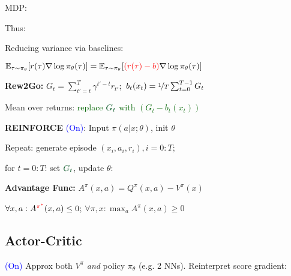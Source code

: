 
MDP: 

Thus: 

Reducing variance via baselines:

\mbox{\fontsize{9.4}{6}\selectfont $\mathbb{E}_{\tau \sim \pi_\theta} [r(\tau) \nabla \log \pi_\theta(\tau)] = \mathbb{E}_{\tau \sim \pi_\theta} [\textcolor{red}{(r(\tau) - b)} \nabla \log \pi_\theta(\tau)]$}

\textbf{Rew2Go:} \mbox{$G_t = \sum_{t' = t}^{T} \gamma^{t' - t} r_{t'}$; $b_t(x_t) = \nicefrac{1}{T} \sum_{t=0}^{T-1} G_t$}


Mean over returns: \textcolor{darkgreen}{replace $\textcolor{darkgreen}{G_t}$ with $(G_t - b_t(x_t))$}



\textbf{REINFORCE} \textcolor{blue}{(On)}: Input $\pi(a | x; \theta)$, init $\theta$

Repeat: generate episode $(x_i, a_i, r_i), i=0:T$;

for $t=0:T$: set $\textcolor{darkgreen}{G_t}$, update $\theta$:





\textbf{Advantage Func:} {\fontsize{9.8}{6}\selectfont $A^\pi(x,a) = Q^\pi(x,a) - V^\pi(x)$}

$\forall x,a: A^{\textcolor{red}{\pi^*}}(x,a) \leq 0$; $\forall \pi,x: \max_a A^\pi(x,a) \geq 0$



\subsection*{Actor-Critic} \textcolor{blue}{(On)} Approx both $V^\pi$ \textit{and} policy $\pi_\theta$ (e.g. 2 NNs). Reinterpret score gradient:

